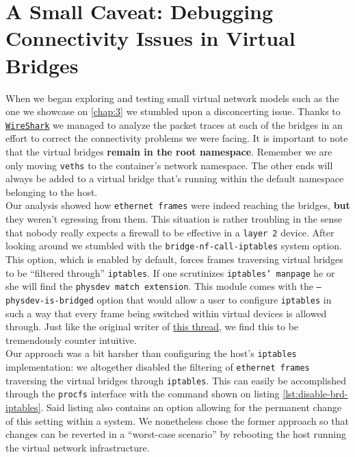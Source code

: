     \section{A Small Caveat: Debugging Connectivity Issues in Virtual Bridges} \label{sec:bridge-caveats}
        When we began exploring and testing small virtual network models such as the one we showcase on \ref{chap:3} we stumbled upon a disconcerting issue. Thanks to \href{https://www.wireshark.org}{\texttt{WireShark}} we managed to analyze the packet traces at each of the bridges in an effort to correct the connectivity problems we were facing. It is important to note that the virtual bridges \textbf{remain in the root namespace}. Remember we are only moving \texttt{veths} to the container's network namespace. The other ends will always be added to a virtual bridge that's running within the default namespace belonging to the host.\\


        Our analysis showed how \texttt{ethernet frames} were indeed reaching the bridges, \textbf{but} they weren't egressing from them. This situation is rather troubling in the sense that nobody really expects a firewall to be effective in a \texttt{layer 2} device. After looking around we stumbled with the \texttt{\allowbreak bridge-nf-call-iptables} system option. This option, which is enabled by default, forces frames traversing virtual bridges to be ``filtered through'' \texttt{iptables}. If one scrutinizes \texttt{iptables' manpage} he or she will find the \texttt{physdev match extension}. This module comes with the \texttt{--physdev-is-bridged} option that would allow a user to configure \texttt{iptables} in such a way that every frame being switched within virtual devices is allowed through. Just like the original writer of \href{http://patchwork.ozlabs.org/project/netdev/patch/1246379267.3749.42.camel@blaa/}{this thread}, we find this to be tremendously counter intuitive.\\

        Our approach was a bit harsher than configuring the host's \texttt{iptables} implementation: we altogether disabled the filtering of \texttt{ethernet frames} traversing the virtual bridges through \texttt{iptables}. This can easily be accomplished through the \texttt{procfs} interface with the command shown on listing \ref{lst:disable-brd-iptables}. Said listing also contains an option allowing for the permanent change of this setting within a system. We nonetheless chose the former approach so that changes can be reverted in a ``worst-case scenario'' by rebooting the host running the virtual network infrastructure.\\


